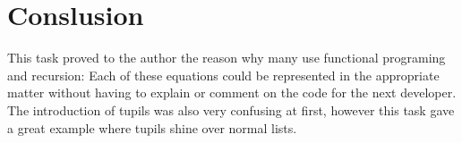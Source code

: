 \documentclass[a4paper,11pt]{article}
\begin{document}
\section*{Conslusion}

This task proved to the author the reason why many use functional programing and recursion: Each of these equations could be represented in the appropriate matter without having to explain or comment on the code for the next developer. The introduction of tupils was also very confusing at first, however this task gave a great example where tupils shine over normal lists. 
\end{document}
